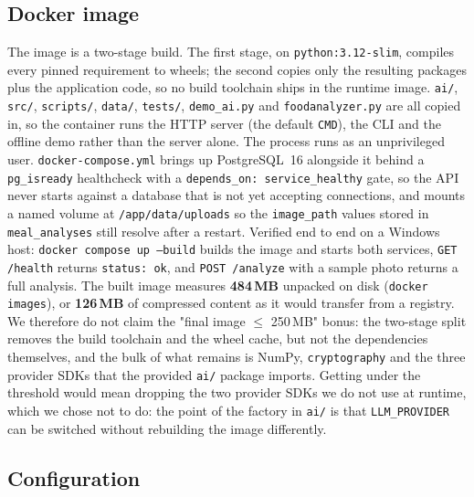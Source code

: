 \documentclass[11pt,a4paper]{article}
\begin{document}
\subsection{Docker image}

The image is a two-stage build. The first stage, on \texttt{python:3.12-slim}, compiles every pinned requirement to wheels; the second copies only the resulting packages plus the application code, so no build toolchain ships in the runtime image. \texttt{ai/}, \texttt{src/}, \texttt{scripts/}, \texttt{data/}, \texttt{tests/}, \texttt{demo\_ai.py} and \texttt{foodanalyzer.py} are all copied in, so the container runs the HTTP server (the default \texttt{CMD}), the CLI and the offline demo rather than the server alone. The process runs as an unprivileged user. \texttt{docker-compose.yml} brings up PostgreSQL~16 alongside it behind a \texttt{pg\_isready} healthcheck with a \texttt{depends\_on: service\_healthy} gate, so the API never starts against a database that is not yet accepting connections, and mounts a named volume at \texttt{/app/data/uploads} so the \texttt{image\_path} values stored in \texttt{meal\_analyses} still resolve after a restart. Verified end to end on a Windows host: \texttt{docker compose up --build} builds the image and starts both services, \texttt{GET /health} returns \texttt{status: ok}, and \texttt{POST /analyze} with a sample photo returns a full analysis. The built image measures \textbf{484\,MB} unpacked on disk (\texttt{docker images}), or \textbf{126\,MB} of compressed content as it would transfer from a registry. We therefore do not claim the "final image $\leq$ 250\,MB" bonus: the two-stage split removes the build toolchain and the wheel cache, but not the dependencies themselves, and the bulk of what remains is NumPy, \texttt{cryptography} and the three provider SDKs that the provided \texttt{ai/} package imports. Getting under the threshold would mean dropping the two provider SDKs we do not use at runtime, which we chose not to do: the point of the factory in \texttt{ai/} is that \texttt{LLM\_PROVIDER} can be switched without rebuilding the image differently.

\subsection{Configuration}
\end{document}
